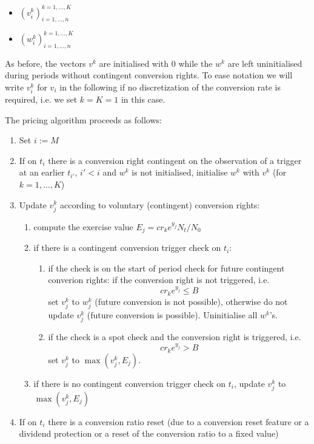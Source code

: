 \begin{itemize}
\item $(v_i^k)_{i=1,\ldots,n}^{k=1,\ldots,K}$
\item $(w_i^k)_{i=1,\ldots,n}^{k=1,\ldots,K}$
\end{itemize}

As before, the vectors $v^k$ are initialised with $0$ while the $w^k$ are left uninitialised during periods without
contingent conversion rights. To ease notation we will write $v^k_i$ for $v_i$ in the following if no discretization of
the conversion rate is required, i.e. we set $k=K=1$ in this case.

The pricing algorithm proceeds as follows:

\begin{enumerate}
\item Set $i := M$
\item \label{algo:convertible_rollback_1} If on $t_i$ there is a conversion right contingent on the observation of a
  trigger at an earlier $t_{i'}$, $i'<i$ and $w^k$ is not initialised, initialise $w^k$ with $v^k$ (for $k=1,\ldots,K$)
\item Update $v_j^k$ according to voluntary (contingent) conversion rights:
  \begin{enumerate}
  \item compute the exercise value $E_j = cr_k e^{y_j} N_t / N_0$
  \item if there is a contingent conversion trigger check on $t_i$:
    \begin{enumerate}
    \item if the check is on the start of period check for future contingent converion rights: if the conversion right
      is not triggered, i.e.
      $$cr_k e^{y_j} \leq B$$
      set $v_j^k$ to $w_j^k$ (future conversion is not possible), otherwise do not update $v_j^k$ (future conversion is
      possible). Uninitialise all $w^k$'s.
    \item if the check is a spot check and the conversion right is triggered, i.e.
      $$cr_k e^{y_j} > B$$
      set $v_j^k$ to $\max(v_j^k, E_j)$.
    \end{enumerate}
  \item if there is no contingent conversion trigger check on $t_i$, update $v_j^k$ to $\max(v_j^k, E_j)$
  \end{enumerate}
\item If on $t_i$ there is a conversion ratio reset (due to a conversion reset feature or a dividend protection or a
  reset of the conversion ratio to a fixed value)

\end{enumerate}
